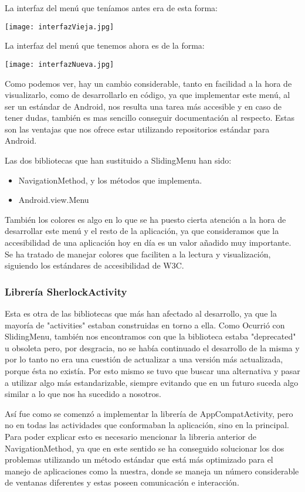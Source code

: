 La interfaz del menú que teníamos antes era de esta forma:

\texttt{[image: interfazVieja.jpg]}

La interfaz del menú que tenemos ahora es de la forma:

\texttt{[image: interfazNueva.jpg]}

Como podemos ver, hay un cambio considerable, tanto en facilidad a la hora de visualizarlo, como de desarrollarlo en código, ya que implementar este menú, al ser un estándar de Android, nos resulta una tarea más accesible y en caso de tener dudas, también es mas sencillo conseguir documentación al respecto. Estas son las ventajas que nos ofrece estar utilizando repositorios estándar para Android.

Las dos bibliotecas que han sustituido a SlidingMenu han sido:

\begin{itemize}
\item NavigationMethod, y los métodos que implementa.
\item Android.view.Menu
\end{itemize}

También los colores es algo en lo que se ha puesto cierta atención a la hora de desarrollar este menú y el resto de la aplicación, ya que consideramos que la accesibilidad de una aplicación hoy en día es un valor añadido muy importante. Se ha tratado de manejar colores que faciliten a la lectura y visualización, siguiendo los estándares de accesibilidad de W3C.

\subsubsection{Librería SherlockActivity}

Esta es otra de las bibliotecas que más han afectado al desarrollo, ya que la mayoría de "activities" estaban construidas en torno a ella. Como Ocurrió con SlidingMenu, también  nos encontramos con que la biblioteca estaba "deprecated" u obsoleta pero, por desgracia, no se había continuado el desarrollo de la misma y por lo tanto no era una cuestión de actualizar a una versión más actualizada, porque ésta no existía. Por esto mismo se tuvo que buscar una alternativa y pasar a utilizar algo más estandarizable, siempre evitando que en un futuro suceda algo similar a lo que nos ha sucedido a nosotros.

Así fue como se comenzó a implementar la librería de AppCompatActivity, pero no en todas las actividades que conformaban la aplicación, sino en la principal. Para poder explicar esto es necesario mencionar la libreria anterior de NavigationMethod, ya que en este sentido se ha conseguido solucionar los dos problemas utilizando un método estándar que está más optimizado para el manejo de aplicaciones como la nuestra, donde se maneja un número considerable de ventanas diferentes y estas poseen comunicación e interacción.

